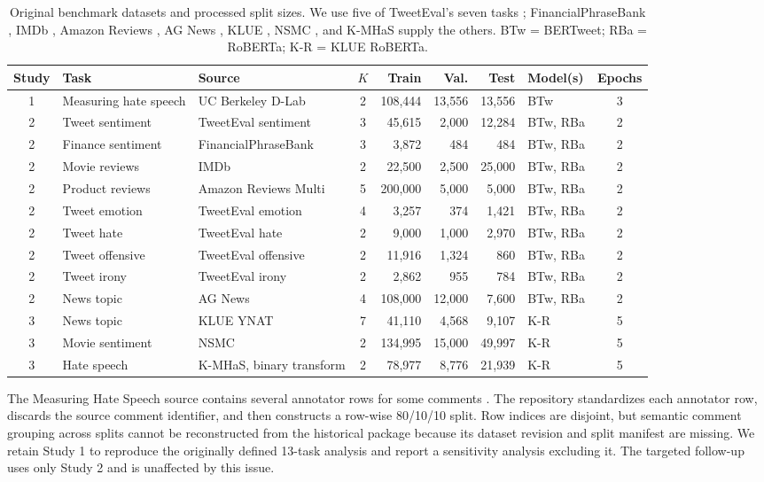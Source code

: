 \documentclass{SPC}
\begin{document}
\begin{table}[!t]
\caption{Original benchmark datasets and processed split sizes. We use five of TweetEval's seven tasks \cite{11}; FinancialPhraseBank \cite{12}, IMDb \cite{13}, Amazon Reviews \cite{14}, AG News \cite{15}, KLUE \cite{4}, NSMC \cite{26}, and K-MHaS \cite{16} supply the others. BTw = BERTweet; RBa = RoBERTa; K-R = KLUE RoBERTa.}
\label{tab:datasets}
\centering
\scriptsize
\setlength{\tabcolsep}{2.8pt}
\begin{tabularx}{\textwidth}{clXcrrrlc}
\toprule
Study & Task & Source & $K$ & Train & Val. & Test & Model(s) & Epochs \\
\midrule
1 & Measuring hate speech & UC Berkeley D-Lab & 2 & 108,444 & 13,556 & 13,556 & BTw & 3 \\
2 & Tweet sentiment & TweetEval sentiment & 3 & 45,615 & 2,000 & 12,284 & BTw, RBa & 2 \\
2 & Finance sentiment & FinancialPhraseBank & 3 & 3,872 & 484 & 484 & BTw, RBa & 2 \\
2 & Movie reviews & IMDb & 2 & 22,500 & 2,500 & 25,000 & BTw, RBa & 2 \\
2 & Product reviews & Amazon Reviews Multi & 5 & 200,000 & 5,000 & 5,000 & BTw, RBa & 2 \\
2 & Tweet emotion & TweetEval emotion & 4 & 3,257 & 374 & 1,421 & BTw, RBa & 2 \\
2 & Tweet hate & TweetEval hate & 2 & 9,000 & 1,000 & 2,970 & BTw, RBa & 2 \\
2 & Tweet offensive & TweetEval offensive & 2 & 11,916 & 1,324 & 860 & BTw, RBa & 2 \\
2 & Tweet irony & TweetEval irony & 2 & 2,862 & 955 & 784 & BTw, RBa & 2 \\
2 & News topic & AG News & 4 & 108,000 & 12,000 & 7,600 & BTw, RBa & 2 \\
3 & News topic & KLUE YNAT & 7 & 41,110 & 4,568 & 9,107 & K-R & 5 \\
3 & Movie sentiment & NSMC & 2 & 134,995 & 15,000 & 49,997 & K-R & 5 \\
3 & Hate speech & K-MHaS, binary transform & 2 & 78,977 & 8,776 & 21,939 & K-R & 5 \\
\bottomrule
\end{tabularx}
\end{table}

The Measuring Hate Speech source contains several annotator rows for some comments \cite{22,27}. The repository standardizes each annotator row, discards the source comment identifier, and then constructs a row-wise 80/10/10 split. Row indices are disjoint, but semantic comment grouping across splits cannot be reconstructed from the historical package because its dataset revision and split manifest are missing. We retain Study 1 to reproduce the originally defined 13-task analysis and report a sensitivity analysis excluding it. The targeted follow-up uses only Study 2 and is unaffected by this issue.
\end{document}
